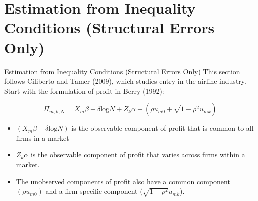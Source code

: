 \documentclass[aspectratio=169,11pt]{beamer}
\begin{document}
\section{Estimation from Inequality Conditions (Structural Errors Only)}

\begin{frame}{\normalsize Estimation from Inequality Conditions (Structural Errors Only)}
This section follows Ciliberto and Tamer (2009), which studies entry in the airline industry.\\
\vspace{0.1in}
Start with the  formulation of profit in Berry (1992):

\begin{equation*}
\Pi_{m,k,N} =X_{m} \beta - \delta \text{log} N + Z_k \alpha +  (\rho u_{m0} + \sqrt{1- \rho^2} u_{mk})
\end{equation*}

\begin{itemize}
\item $(X_{m} \beta - \delta \text{log} N) $ is the observable component of profit that is common to all firms in a market
\item $Z_k \alpha$ is the observable component of profit that varies across firms within a market. 
\item The unobserved components of profit also have a common component $(\rho u_{m0}) $ and a firm-specific component ($\sqrt{1- \rho^2} u_{mk}$).
\end{itemize}
\end{frame}
\end{document}

